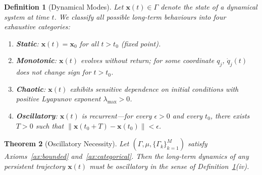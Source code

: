 \documentclass[11pt,twocolumn,a4paper]{article}
\newtheorem{theorem}{Theorem}[section]
\newtheorem{definition}[theorem]{Definition}
\begin{document}
\begin{definition}[Dynamical Modes]\label{def:modes}
Let $\bm{x}(t) \in \Gamma$ denote the state of a dynamical system at time $t$. We classify all possible long-term behaviours into four exhaustive categories:
\begin{enumerate}[label=(\roman*)]
    \item \textbf{Static}: $\bm{x}(t) = \bm{x}_0$ for all $t > t_0$ (fixed point).
    \item \textbf{Monotonic}: $\bm{x}(t)$ evolves without return; for some coordinate $q_j$, $\dot{q}_j(t)$ does not change sign for $t > t_0$.
    \item \textbf{Chaotic}: $\bm{x}(t)$ exhibits sensitive dependence on initial conditions with positive Lyapunov exponent $\lambda_{\max} > 0$.
    \item \textbf{Oscillatory}: $\bm{x}(t)$ is recurrent---for every $\epsilon > 0$ and every $t_0$, there exists $T > 0$ such that $\|\bm{x}(t_0 + T) - \bm{x}(t_0)\| < \epsilon$.
\end{enumerate}
\end{definition}

\begin{theorem}[Oscillatory Necessity]\label{thm:oscillatory_necessity}
Let $(\Gamma, \mu, \{\Gamma_k\}_{k=1}^M)$ satisfy Axioms~\ref{ax:bounded} and~\ref{ax:categorical}. Then the long-term dynamics of any persistent trajectory $\bm{x}(t)$ must be oscillatory in the sense of Definition~\ref{def:modes}(iv).
\end{theorem}
\end{document}
